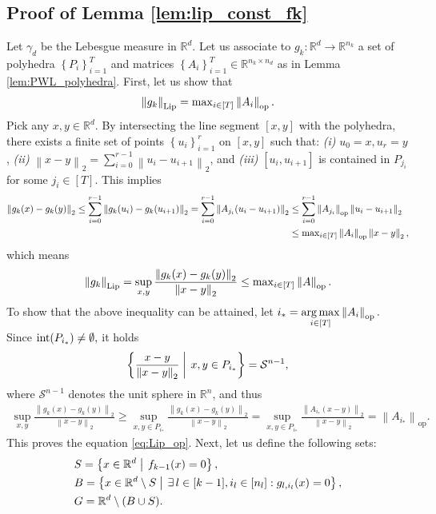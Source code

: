 \documentclass[11pt]{article}
\makeatletter
\def\RR{\mathbb{R}}
\def\Set#1{\left\{ #1 \right\}}
\def\Bigbar#1{\mathrel{\left|\vphantom{#1}\right.}}%
\def\Setbar#1#2{\Set{#1 \Bigbar{#1 #2} #2}}
\newenvironment{proof}{\par\noindent{\bf Proof:\ }}{\hfill$\Box$\\[2mm]}
\newcommand{\norm}[1]{\left\|#1\right\|}
\def\Lip{\mathrm{Lip}}
\def\op{\mathrm{op}}
\def\interior{\mathop{\rm int}\nolimits}
\def\argmax{\mathop{\rm arg\,max}\limits}
\def\max{\mathop{\rm max}\nolimits}
\makeatother
\begin{document}
\subsection{Proof of Lemma \ref{lem:lip_const_fk}}\label{app:lem:lip_const_fk}
    Let $\gamma_d$ be the Lebesgue measure in $\RR^d.$
    Let us associate to $g_k:\RR^d\to\RR^{n_k}$ a set of polyhedra $\Set{P_i}_{i=1}^{T}$
    and matrices $\Set{A_i}_{i=1}^{T}\in\RR^{n_k\times n_d}$ as in Lemma \ref{lem:PWL_polyhedra}.
    First, let us show that
    \begin{align}\label{eq:Lip_op}
	\norm{g_k}_{\Lip} 
	=\max_{i\in[T]} \norm{A_i}_{\op}.
    \end{align}
    Pick any $x,y\in\RR^d.$ 
    By intersecting the line segment $[x,y]$ with the polyhedra,
    there exists a finite set of points $\Set{u_i}_{i=1}^{r}$ on $[x,y]$ such that:
    \emph{(i)} $u_0=x,u_r=y$, \emph{(ii)} $\norm{x-y}_2=\sum_{i=0}^{r-1}\norm{u_i-u_{i+1}}_2$, and \emph{(iii)} $[u_i,u_{i+1}]$ is contained in $P_{j_i}$ for some $j_i\in[T].$
    This implies
    \begin{align*}
	\norm{g_k(x)-g_k(y)}_2
	\leq \sum_{i=0}^{r-1} \norm{g_k(u_i)-g_k(u_{i+1})}_2
	= \sum_{i=0}^{r-1} \norm{A_{j_i} (u_i-u_{i+1})}_2
	&\leq \sum_{i=0}^{r-1} \norm{A_{j_i}}_{\op} \norm{u_i-u_{i+1}}_2\\
	&\leq \max_{i\in[T]} \norm{A_i}_{\op} \norm{x-y}_2 ,
    \end{align*}
    which means
    \begin{align*}
	\norm{g_k}_{\Lip} 
	= \sup_{x, y} \frac{\norm{g_k(x)-g_k(y)}_2}{\norm{x-y}_2}
	\leq \max_{i\in[T]} \norm{A}_{\op} .
    \end{align*}
    To show that the above inequality can be attained,
    let $i_*=\argmax_{i\in[T]}\norm{A_i}_{\op}.$ 
    Since $\interior(P_{i_*})\neq\emptyset,$ it holds $$\Setbar{\frac{x-y}{\norm{x-y}_2}}{x,y\in P_{i_*}}=\mathcal{S}^{n-1},$$
    where $\mathcal{S}^{n-1}$ denotes the unit sphere in $\RR^n$, and thus
    \begin{align*}
	\sup_{x, y} \frac{\norm{g_k(x)-g_k(y)}_2}{\norm{x-y}_2}
	\geq
	\sup_{x,y\in P_{i_*}} \frac{\norm{g_k(x)-g_k(y)}_2}{\norm{x-y}_2}
	=\sup_{x,y\in P_{i_*}} \frac{\norm{A_{i_*}(x-y)}_2}{\norm{x-y}_2}
	=\norm{A_{i_*}}_{\op} .
    \end{align*}
    This proves the equation \eqref{eq:Lip_op}.
    Next, let us define the following sets:
    \begin{align*}
	&S=\Setbar{x\in\RR^d}{f_{k-1}(x)=0},\\
	&B=\Setbar{x\in\RR^d\setminus S}{\exists\,l\in[k-1], i_l\in[n_l]: g_{l,i_l}(x)=0},\\
	&G=\RR^d\setminus(B\cup S).
    \end{align*}
\end{document}
